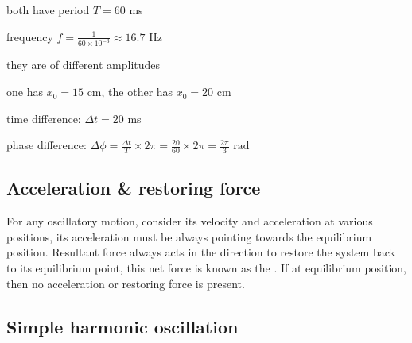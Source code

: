 \begin{marginfigure}
	\vspace*{-12pt}
		\centering
{}
\vspace*{-25pt}
\end{marginfigure}

\begin{soln} both have period $T=60$ ms

frequency $f=\frac{1}{60\times10^{-3}} \approx 16.7$ Hz

they are of different amplitudes

one has $x_0=15$ cm, the other has $x_0=20$ cm

time difference: $\Delta t = 20$ ms

phase difference: $\Delta \phi = \frac{\Delta t}{T} \times 2\pi = \frac{20}{60} \times 2\pi = \frac{2\pi}{3} \text{ rad}$
\end{soln}


\subsection{Acceleration \& restoring force}
For any oscillatory motion, consider its velocity and acceleration at various positions, its acceleration must be always pointing towards the equilibrium position. Resultant force always acts in the direction to restore the system back to its equilibrium point, this net force is known as the . If at equilibrium position, then no acceleration or restoring force is present.

\subsection{Simple harmonic oscillation}

